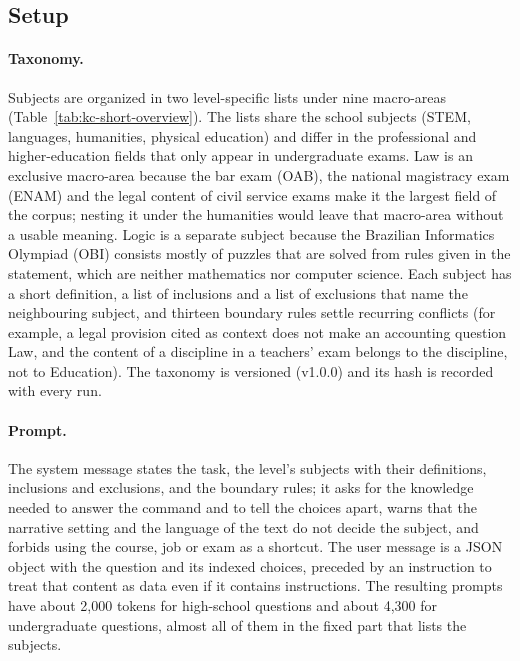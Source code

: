 \subsection{Setup}
\label{app:kc-short-setup}

\paragraph{Taxonomy.} Subjects are organized in two level-specific lists
under nine macro-areas (Table~\ref{tab:kc-short-overview}). The lists share
the school subjects (STEM, languages, humanities, physical education) and
differ in the professional and higher-education fields that only appear in
undergraduate exams. Law is an exclusive macro-area because the bar exam
(OAB), the national magistracy exam (ENAM) and the legal content of civil
service exams make it the largest field of the corpus; nesting it under the
humanities would leave that macro-area without a usable meaning. Logic is a
separate subject because the Brazilian Informatics Olympiad (OBI) consists
mostly of puzzles that are solved from rules given in the statement, which
are neither mathematics nor computer science. Each subject has a short
definition, a list of inclusions and a list of exclusions that name the
neighbouring subject, and thirteen boundary rules settle recurring conflicts
(for example, a legal provision cited as context does not make an accounting
question Law, and the content of a discipline in a teachers' exam belongs to
the discipline, not to Education). The taxonomy is versioned (v1.0.0) and its
hash is recorded with every run.

\paragraph{Prompt.} The system message states the task, the level's subjects
with their definitions, inclusions and exclusions, and the boundary rules; it
asks for the knowledge needed to answer the command and to tell the choices
apart, warns that the narrative setting and the language of the text do not
decide the subject, and forbids using the course, job or exam as a shortcut.
The user message is a JSON object with the question and its indexed choices,
preceded by an instruction to treat that content as data even if it contains
instructions. The resulting prompts have about 2,000 tokens for high-school
questions and about 4,300 for undergraduate questions, almost all of them in
the fixed part that lists the subjects.

